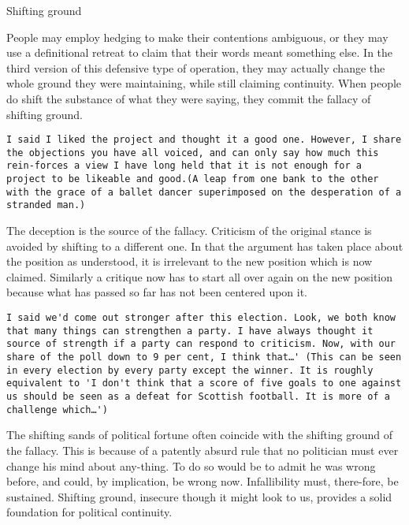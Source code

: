 \documentclass[a4paper,12pt,single,pdftex]{scrartcl}
\begin{document}
  

Shifting ground
    
      People may employ hedging to make their contentions ambiguous, or they may use a definitional retreat to claim that their words meant something else. In the third version of this defensive type of operation, they may actually change the whole ground they were maintaining, while still claiming continuity. When people do shift the substance of what they were saying, they commit the fallacy of shifting ground.
    \\

    \begin{verbatim}I said I liked the project and thought it a good one. However, I share the objections you have all voiced, and can only say how much this rein-forces a view I have long held that it is not enough for a project to be likeable and good.(A leap from one bank to the other with the grace of a ballet dancer superimposed on the desperation of a stranded man.)\end{verbatim}
    
      The deception is the source of the fallacy. Criticism of the original stance is avoided by shifting to a different one. In that the argument has taken place about the position as understood, it is irrelevant to the new position which is now claimed. Similarly a critique now has to start all over again on the new position because what has passed so far has not been centered upon it.
    \\

    \begin{verbatim}I said we'd come out stronger after this election. Look, we both know that many things can strengthen a party. I have always thought it source of strength if a party can respond to criticism. Now, with our share of the poll down to 9 per cent, I think that…' (This can be seen in every election by every party except the winner. It is roughly equivalent to 'I don't think that a score of five goals to one against us should be seen as a defeat for Scottish football. It is more of a challenge which…')\end{verbatim}
    
      The shifting sands of political fortune often coincide with the shifting ground of the fallacy. This is because of a patently absurd rule that no politician must ever change his mind about any-thing. To do so would be to admit he was wrong before, and could, by implication, be wrong now. Infallibility must, there-fore, be sustained. Shifting ground, insecure though it might look to us, provides a solid foundation for political continuity.
    \\
\end{document}
